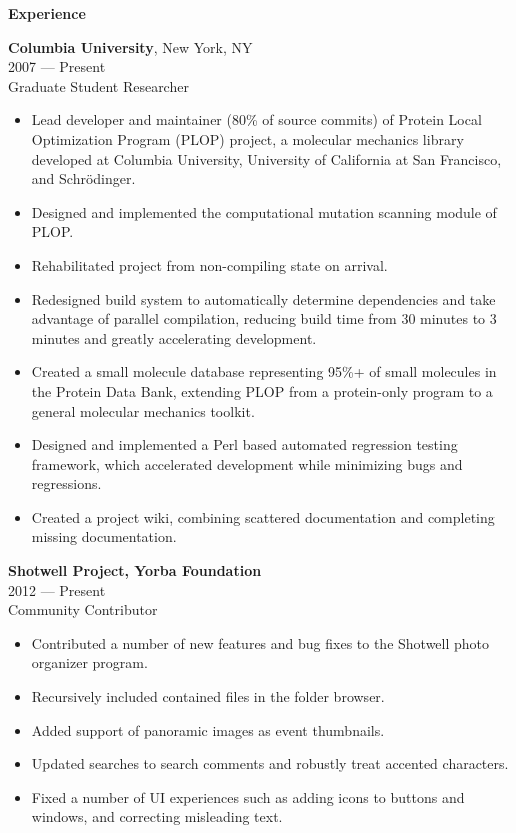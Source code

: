 \vspace{\mybigskip}
\myfontsize{\bigheader}
\textbf{Experience}

\myfontsize{\bodysize}
\textbf{Columbia University}, New York, NY\\
2007 --- Present\\
Graduate Student Researcher\\
\begin{itemize}[topsep=1ex, partopsep=0ex, parsep=0ex, itemsep=0.5ex]
    \item Lead developer and maintainer ({\mytilde}80\% of source commits) of Protein Local Optimization Program (PLOP) project, a molecular mechanics library developed at Columbia University, University of California at San Francisco, and Schr\"{o}dinger.
    \item Designed and implemented the computational mutation scanning module of PLOP.
    \item Rehabilitated project from non-compiling state on arrival.
    \item Redesigned build system to automatically determine dependencies and take advantage of parallel compilation, reducing build time from {\mytilde}30 minutes to {\mytilde}3 minutes and greatly accelerating development.
    \item Created a small molecule database representing 95\%+ of small molecules in the Protein Data Bank, extending PLOP from a protein-only program to a general molecular mechanics toolkit.
    \item Designed and implemented a Perl based automated regression testing framework, which accelerated development while minimizing bugs and regressions.
    \item Created a project wiki, combining scattered documentation and completing missing documentation.
\end{itemize}
\vspace{\mybigskip}

\textbf{Shotwell Project, Yorba Foundation}\\
2012 --- Present\\
Community Contributor\\
\begin{itemize}[topsep=1ex, partopsep=0ex, parsep=0ex, itemsep=0.5ex]
    \item Contributed a number of new features and bug fixes to the Shotwell photo organizer program.
    \item Recursively included contained files in the folder browser.
    \item Added support of panoramic images as event thumbnails.
    \item Updated searches to search comments and robustly treat accented characters.
    \item Fixed a number of UI experiences such as adding icons to buttons and windows, and correcting misleading text.
\end{itemize}

